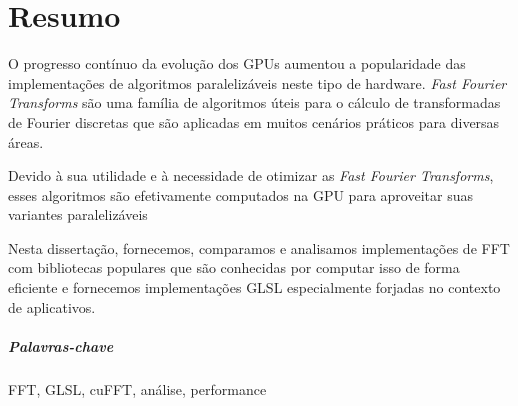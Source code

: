 \documentclass[
  oneside,
  11pt, a4paper,
  footinclude=true,
  headinclude=true,
  cleardoublepage=empty
]{scrbook}
\begin{document}
    \cleardoublepage


\chapter*{Resumo}

O progresso contínuo da evolução dos GPUs aumentou a popularidade das implementações de algoritmos paralelizáveis neste tipo de hardware.
\textit{Fast Fourier Transforms} são uma família de algoritmos úteis para o cálculo de transformadas de Fourier discretas que são aplicadas em muitos cenários práticos para diversas áreas.

Devido à sua utilidade e à necessidade de otimizar as \textit{Fast Fourier Transforms}, esses algoritmos são efetivamente computados na GPU para aproveitar suas variantes paralelizáveis

Nesta dissertação, fornecemos, comparamos e analisamos implementações de FFT com bibliotecas populares que são conhecidas por computar isso de forma eficiente e fornecemos implementações GLSL especialmente forjadas no contexto de aplicativos.
    
\paragraph{Palavras-chave} FFT, GLSL, cuFFT, análise, performance


    \cleardoublepage
    
    \setcounter{page}{3}
    
    \cleardoublepage
    \tableofcontents
    
    \cleardoublepage
    \listoffigures
    
    \cleardoublepage
    \listoftables
    

    
    \cleardoublepage
    \setcounter{page}{5}


\end{document}
